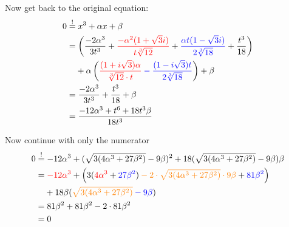 Now get back to the original equation:
\begin{align}
    0 &\stackrel{!}{=} x^3 + \alpha x + \beta \\
       &= \left (\frac{-2 \alpha^3}{3 t^3}
        + \color{red}\frac{-\alpha^2(1+\sqrt{3}i)}{t\sqrt[3]{12}}\color{black}
        + \color{blue}\frac{\alpha t(1-\sqrt{3}i)}{2\sqrt[3]{18}}\color{black}
        + \frac{t^3}{18} \right )\\
    &\hphantom{{}=} + \alpha \left (\color{red}\frac{(1+i \sqrt{3})\alpha}{\sqrt[3]{12} \cdot t} \color{black}
     \color{blue}-\frac{(1-i\sqrt{3}) t}{2\sqrt[3]{18}} \color{black} \right ) + \beta\\
    &= \frac{-2 \alpha^3}{3 t^3}
    + \frac{t^3}{18}
    + \beta\\
    &= \frac{-12 \alpha^3 + t^6+18 t^3 \beta}{18t^3}
\end{align}

Now continue with only the numerator
\begin{align}
    0 &\stackrel{!}{=}
    - 12 \alpha^3
    + (\sqrt{3(4 \alpha^3 + 27 \beta^2)}-9\beta)^2
    + 18 (\sqrt{3(4 \alpha^3 + 27 \beta^2)} - 9 \beta) \beta\\
    &=
    \color{red}- 12 \alpha^3 \color{black}+
    \left (
        3(\color{red}4 \alpha^3\color{black} + \color{blue}27 \beta^2 \color{black})
        \color{orange}- 2 \cdot \sqrt{3(4 \alpha^3 + 27 \beta^2)} \cdot 9\beta\color{black}
        + \color{blue}81 \beta^2\color{black}
    \right )\\
    &\hphantom{{}=}+ 18 \beta (\color{orange}\sqrt{3(4 \alpha^3 + 27 \beta^2)}\color{black} \color{blue}- 9 \beta\color{black}) \\
    &= 81 \beta^2 + 81 \beta^2 - 2 \cdot 81 \beta^2\\
    &= 0
\end{align}
